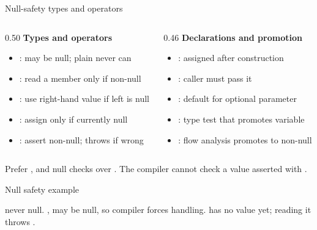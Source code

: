 \documentclass[10pt,aspectratio=169,t]{beamer}
\begin{document}
\begin{frame}[eyebrow=Reference]{Null-safety types and operators}
  {\small
  \begin{columns}[T]
    \begin{column}{0.50\textwidth}
      \textbf{Types and operators}
      \begin{itemize}
        \item {}: may be null; plain  never can
        \item {}: read a member only if non-null
        \item {}: use right-hand value if left is null
        \item {}: assign only if currently null
        \item \code{!}: assert non-null; throws if wrong
      \end{itemize}
    \end{column}
    \begin{column}{0.46\textwidth}
      \textbf{Declarations and promotion}
      \begin{itemize}
        \item {}: assigned after construction
        \item {}: caller must pass it
        \item {}: default for optional parameter
        \item {}: type test that promotes variable
        \item {}: flow analysis promotes to non-null
      \end{itemize}
    \end{column}
  \end{columns}
  }
  \vskip 2mm
  \begin{takeaway}{Prefer ,  and null checks over \code{!}.}
    The compiler cannot check a value asserted with \code{!}.
  \end{takeaway}
\end{frame}

\begin{frame}[fragile,eyebrow=Reference]{Null safety example}
  {\small
   never null. ,  may be null, so compiler forces handling.  has no value yet; reading it throws .
  }
\end{frame}
\end{document}
